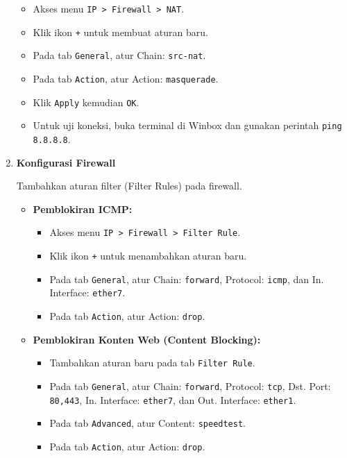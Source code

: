 \begin{enumerate}
    \begin{itemize}
        \item Akses menu \texttt{IP > Firewall > NAT}.
        \item Klik ikon \texttt{+} untuk membuat aturan baru.
        \item Pada tab \texttt{General}, atur Chain: \texttt{src-nat}.
        \item Pada tab \texttt{Action}, atur Action: \texttt{masquerade}.
        \item Klik \texttt{Apply} kemudian \texttt{OK}.
        \item Untuk uji koneksi, buka terminal di Winbox dan gunakan perintah \texttt{ping 8.8.8.8}.
    \end{itemize}

    \item \textbf{Konfigurasi Firewall}

    Tambahkan aturan filter (Filter Rules) pada firewall.

    \begin{itemize}
        \item \textbf{Pemblokiran ICMP:}
        \begin{itemize}
            \item Akses menu \texttt{IP > Firewall > Filter Rule}.
            \item Klik ikon \texttt{+} untuk menambahkan aturan baru.
            \item Pada tab \texttt{General}, atur Chain: \texttt{forward}, Protocol: \texttt{icmp}, dan In. Interface: \texttt{ether7}.
            \item Pada tab \texttt{Action}, atur Action: \texttt{drop}.
        \end{itemize}
        \item \textbf{Pemblokiran Konten Web (Content Blocking):}
        \begin{itemize}
            \item Tambahkan aturan baru pada tab \texttt{Filter Rule}.
            \item Pada tab \texttt{General}, atur Chain: \texttt{forward}, Protocol: \texttt{tcp}, Dst. Port: \texttt{80,443}, In. Interface: \texttt{ether7}, dan Out. Interface: \texttt{ether1}.
            \item Pada tab \texttt{Advanced}, atur Content: \texttt{speedtest}.
            \item Pada tab \texttt{Action}, atur Action: \texttt{drop}.
        \end{itemize}
    \end{itemize}


\end{enumerate}
